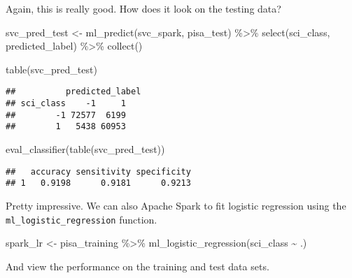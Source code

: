 \documentclass[
]{book}
\newenvironment{Shaded}{\begin{snugshade}}{\end{snugshade}}
\newcommand{\FunctionTok}[1]{\textcolor[rgb]{0.00,0.00,0.00}{#1}}
\newcommand{\NormalTok}[1]{#1}
\newcommand{\OtherTok}[1]{\textcolor[rgb]{0.56,0.35,0.01}{#1}}
\newcommand{\SpecialCharTok}[1]{\textcolor[rgb]{0.00,0.00,0.00}{#1}}
\begin{document}
Again, this is really good. How does it look on the testing data?

\begin{Shaded}
\begin{Highlighting}[]
\NormalTok{svc\_pred\_test }\OtherTok{\textless{}{-}} \FunctionTok{ml\_predict}\NormalTok{(svc\_spark, pisa\_test) }\SpecialCharTok{\%\textgreater{}\%} 
  \FunctionTok{select}\NormalTok{(sci\_class, predicted\_label) }\SpecialCharTok{\%\textgreater{}\%} 
  \FunctionTok{collect}\NormalTok{()}
\end{Highlighting}
\end{Shaded}

\begin{Shaded}
\begin{Highlighting}[]
\FunctionTok{table}\NormalTok{(svc\_pred\_test)}
\end{Highlighting}
\end{Shaded}

\begin{verbatim}
##          predicted_label
## sci_class    -1     1
##        -1 72577  6199
##        1   5438 60953
\end{verbatim}

\begin{Shaded}
\begin{Highlighting}[]
\FunctionTok{eval\_classifier}\NormalTok{(}\FunctionTok{table}\NormalTok{(svc\_pred\_test))}
\end{Highlighting}
\end{Shaded}

\begin{verbatim}
##   accuracy sensitivity specificity
## 1   0.9198      0.9181      0.9213
\end{verbatim}

Pretty impressive. We can also Apache Spark to fit logistic regression using the \texttt{ml\_logistic\_regression} function.

\begin{Shaded}
\begin{Highlighting}[]
\NormalTok{spark\_lr }\OtherTok{\textless{}{-}}\NormalTok{ pisa\_training }\SpecialCharTok{\%\textgreater{}\%} 
  \FunctionTok{ml\_logistic\_regression}\NormalTok{(sci\_class }\SpecialCharTok{\textasciitilde{}}\NormalTok{ .)}
\end{Highlighting}
\end{Shaded}

And view the performance on the training and test data sets.
\end{document}

